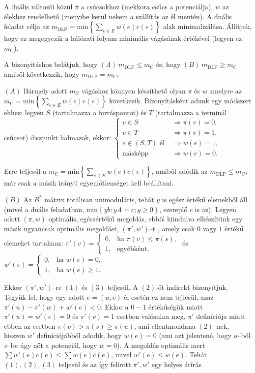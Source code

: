 A duális változói közül $\pi$ a csúcsokhoz (mekkora csúcs a potenciálja), $w$ az
élekhez rendelhető (menyibe kerül nekem a szállítás az él mentén). A duális
feladat célja az $m_{\text{DLP}}= \mbox{min} \left\{ \sum_{e\in E}^{}
w(e)c(e)\right\}$ alak minimalizálása. Állítjuk, hogy ez megegyezik a hálózati
folyam minimális vágásának értékével (legyen ez $m_{\text{C}}$). 

A bizonyitáshoz belátjuk, hogy $(A)~m_{\mbox{DLP}} \leq m_{\mbox{C}}$ és, hogy
$(B)~m_{\mbox{DLP}} \geq m_{\mbox{C}}$ amiből következzik, hogy $ m_{\mbox{DLP}}
= m_{\mbox{C}}$.

$(A)$ Bármely adott $m_{\mbox{C}}$ vágáshoz könnyen készíthető olyan $\pi$ és $w$
amelyre az $m_{\text{C}}= \mbox{min} \left\{ \sum_{e\in E}^{} w(e)c(e)\right\}$
következik. Bizonyításként adunk egy módszert ehhez: legyen $S$ (tartalmazza a
forráspontot) és $T$ (tartalmazza a terminál csúcsot) diszjunkt halmazok, ekkor:
$\begin{cases}
v \in S &\Rightarrow \pi(v)=0, \\
v \in T &\Rightarrow \pi(v)=1, \\
e \in (S,T) \mbox{ él } &\Rightarrow w(e)=1, \\
\mbox{másképp} &\Rightarrow w(e)=0.
\end{cases}$

Erre teljesül a $m_{\text{C}}= \mbox{min} \left\{ \sum_{e\in E}^{}
w(e)c(e)\right\}$, amiből adódik az $m_{\mbox{DLP}} \leq m_{\mbox{C}}$, már csak
a másik irányú egyenlőtlenséget kell beállítani. 

$(B)$ Az $B^*$ mátrix totálisan unimoduláris, tehát $y$ is egész értékű elemekből
áll (mivel a duális feladatban, min$\left\{ yb:yA=c; y\geq 0 \right\}$, szereplő
$c$ is az). Legyen adott $(\pi,w)$ optimális, egészértékű megoldás, ebből
kiindulva elkészítünk egy másik ugyancsak optimális megoldást, $(\pi',w')$--t
, amely csak $0$ vagy $1$ értékű elemeket tartalmaz:
$\pi'(v)=
\begin{cases}
0, &\mbox{ha } \pi(v) \leq \pi(s), \\
1, &\mbox{egyébként},
\end{cases}$ és
$w'(e)=
\begin{cases}
0, &\mbox{ha } w(e)=0, \\
1, &\mbox{ha } w(e) \geq 1.
\end{cases}$

Ekkor $(\pi',w')$--re $(1)$ és $(3)$ teljesül. A $(2)$-öt indirekt bizonyítjuk.
Tegyük fel, hogy egy adott $e=(u,v)$ él esetén ez nem tejlesül, azaz
$\pi'(u)-\pi'(w)+w'(e)<0$. Ekkor a $0-1$ értékűségük miatt $\pi'(u)=w'(e)=0$ és
$\pi'(v)=1$ esetben valósulna meg. $\pi'$ definíciója miatt ebben az esetben
$\pi(v) > \pi(s) \geq \pi(u)$, ami ellentmondana $(2)$--nek, hisszen $w'$
definíciójábból adodik, hogy $w(e)=0$ (ami azt jelentené, hogy $u$--ból $v$--be
úgy nőt a potenciál, hogy $w=0$). A megoldás optimális mert $\sum w'(e)c(e) \leq
\sum w(e)c(e)$, mivel $w'(e) \leq w(e)$. Tehát $(1), (2), (3)$ teljesül és az így
felírott $\pi', w'$ egy helyes átírás.

